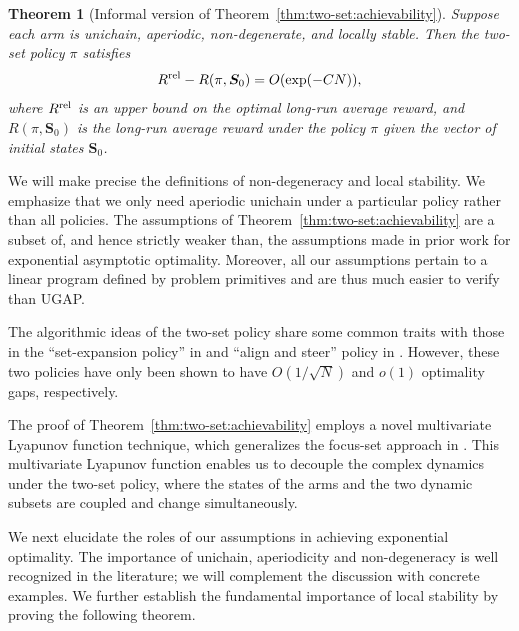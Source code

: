 \documentclass[11pt,letterpaper]{article}
\theoremstyle{plain}
\newtheorem*{theorem*}{Theorem}
\theoremstyle{definition}
\theoremstyle{remark}
\newcommand{\ve}[1]{\bm{#1}}
\newcommand{\veS}{\ve{S}}
\newcommand{\rel}{\textup{rel}} %
\newcommand{\ravg}{R}
\newcommand{\rsysn}{\ravg(\pi, \veS_0)}
\newcommand{\rrel}{\ravg^\rel}
\begin{document}
\begin{theorem*}[Informal version of Theorem~\ref{thm:two-set:achievability}]
    Suppose each arm is unichain, aperiodic, non-degenerate, and locally stable. 
    Then the two-set policy $\pi$ satisfies 
    \begin{align}
        \rrel - \rsysn = O(\exp(-CN)),
    \end{align}
    where $\rrel$ is an upper bound on the optimal long-run average reward, and $\rsysn$ is the long-run average reward under the policy $\pi$ given the vector of initial states $\veS_0$. 
\end{theorem*}
We will make precise the definitions of non-degeneracy and local stability. We emphasize that we only need aperiodic unichain under a particular policy rather than all policies. 
The assumptions of Theorem~\ref{thm:two-set:achievability} are a subset of, and hence strictly weaker than, the assumptions made in prior work \cite{GasGauYan_23_exponential,GasGauYan_23_whittles} for exponential asymptotic optimality. Moreover, all our assumptions pertain to a linear program defined by problem primitives and are thus much easier to verify than UGAP.  



The algorithmic ideas of the two-set policy share some common traits with those in the ``set-expansion policy'' in \cite{HonXieCheWan_24} and ``align and steer'' policy in \cite{Yan_24_multichain}.
However, these two policies have only been shown to have $O(1/\sqrt{N})$ and $o(1)$ optimality gaps, respectively.



The proof of Theorem~\ref{thm:two-set:achievability} employs a novel multivariate Lyapunov function technique, which generalizes the focus-set approach in \cite{HonXieCheWan_24}. This multivariate Lyapunov function enables us to decouple the complex dynamics under the two-set policy, where the states of the arms and the two dynamic subsets are coupled and change simultaneously.


We next elucidate the roles of our assumptions in achieving exponential optimality. 
The importance of unichain, aperiodicity and non-degeneracy is well recognized in the literature; we will complement the discussion with concrete examples.
We further establish the fundamental importance of local stability by proving the following theorem. 
\end{document}

